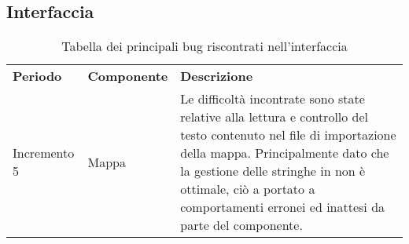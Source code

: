 \subsection{Interfaccia}

\begin{table} [!ht]
	\begin{center}
		\begin{tabular} { m{2.5cm} m{2.5cm} m{11cm}  }
			\rowcolor{lightgray}
			\textbf{Periodo} & \textbf{Componente} & \textbf{Descrizione}\\
			
			Incremento 5 & Mappa & Le difficoltà incontrate sono state relative alla lettura e controllo del testo contenuto nel file di importazione della mappa. Principalmente dato che la gestione delle stringhe in \glock{Javascript} non è ottimale, ciò a portato a comportamenti erronei ed inattesi da parte del componente. \\
			
		\end{tabular}
	\end{center}
	\caption{Tabella dei principali bug riscontrati nell'interfaccia}
\end{table}